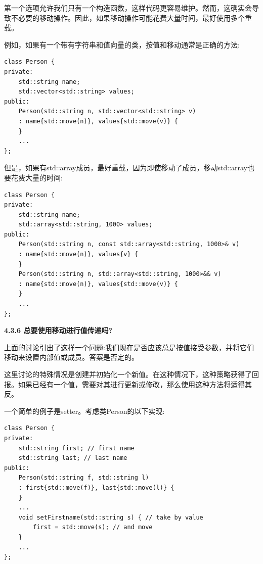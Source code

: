 第一个选项允许我们只有一个构造函数，这样代码更容易维护。然而，这确实会导致不必要的移动操作。因此，如果移动操作可能花费大量时间，最好使用多个重载。\par

例如，如果有一个带有字符串和值向量的类，按值和移动通常是正确的方法:\par

\begin{lstlisting}[caption={}]
class Person {
private:
	std::string name;
	std::vector<std::string> values;
public:
	Person(std::string n, std::vector<std::string> v)
	: name{std::move(n)}, values{std::move(v)} {
	}
	...
};
\end{lstlisting}

但是，如果有std::array成员，最好重载，因为即使移动了成员，移动std::array也要花费大量的时间:\par

\begin{lstlisting}[caption={}]
class Person {
private:
	std::string name;
	std::array<std::string, 1000> values;
public:
	Person(std::string n, const std::array<std::string, 1000>& v)
	: name{std::move(n)}, values{v} {
	}
	Person(std::string n, std::array<std::string, 1000>&& v)
	: name{std::move(n)}, values{std::move(v)} {
	}
	...
};
\end{lstlisting}

\hspace*{\fill} \par %
\textbf{4.3.6 总要使用移动进行值传递吗?}

上面的讨论引出了这样一个问题:我们现在是否应该总是按值接受参数，并将它们移动来设置内部值或成员。答案是否定的。\par

这里讨论的特殊情况是创建并初始化一个新值。在这种情况下，这种策略获得了回报。如果已经有一个值，需要对其进行更新或修改，那么使用这种方法将适得其反。\par

一个简单的例子是setter。考虑类Person的以下实现:\par

\begin{lstlisting}[caption={}]
class Person {
private:
	std::string first; // first name
	std::string last; // last name
public:
	Person(std::string f, std::string l)
	: first{std::move(f)}, last{std::move(l)} {
	}
	...
	void setFirstname(std::string s) { // take by value
		first = std::move(s); // and move
	}
	...
};
\end{lstlisting}

